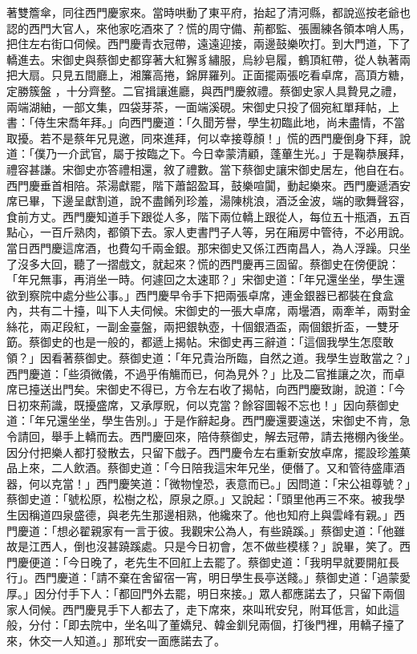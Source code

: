 著雙簷傘，同往西門慶家來。當時哄動了東平府，抬起了清河縣，都說巡按老爺也認的西門大官人，來他家吃酒來了？慌的周守備、荊都監、張團練各領本哨人馬，把住左右街口伺候。西門慶青衣冠帶，遠遠迎接，兩邊鼓樂吹打。到大門道，下了轎進去。宋御史與蔡御史都穿著大紅獬豸繡服，烏紗皂履，鶴頂紅帶，從人執著兩把大扇。只見五間廳上，湘簾高捲，錦屏羅列。正面擺兩張吃看卓席，高頂方糖，定勝簇盤 ，十分齊整。二官揖讓進廳，與西門慶敘禮。蔡御史家人具贄見之禮，兩端湖紬，一部文集，四袋芽茶，一面端溪硯。宋御史只投了個宛紅單拜帖，上書：「侍生宋喬年拜。」向西門慶道：「久聞芳譽，學生初臨此地，尚未盡情，不當取擾。若不是蔡年兄見邀，同來進拜，何以幸接尊顏！」慌的西門慶倒身下拜，說道：「僕乃一介武官，屬于按臨之下。今日幸蒙清顧，蓬蓽生光。」于是鞠恭展拜，禮容甚謙。宋御史亦答禮相還，敘了禮數。當下蔡御史讓宋御史居左，他自在右。西門慶垂首相陪。茶湯獻罷，階下蕭韶盈耳，鼓樂喧闐，動起樂來。西門慶遞酒安席已畢，下邊呈獻割道，說不盡餚列珍羞，湯陳桃浪，酒泛金波，端的歌舞聲容，食前方丈。西門慶知道手下跟從人多，階下兩位轎上跟從人，每位五十瓶酒，五百點心，一百斤熟肉，都領下去。家人吏書門子人等，另在廂房中管待，不必用說。當日西門慶這席酒，也費勾千兩金銀。那宋御史又係江西南昌人，為人浮躁。只坐了沒多大回，聽了一摺戲文，就起來？慌的西門慶再三固留。蔡御史在傍便說：「年兄無事，再消坐一時。何遽回之太速耶？」宋御史道：「年兄還坐坐，學生還欲到察院中處分些公事。」西門慶早令手下把兩張卓席，連金銀器已都裝在食盒內，共有二十擡，叫下人夫伺候。宋御史的一張大卓席，兩壜酒，兩牽羊，兩對金絲花，兩疋段紅，一副金臺盤，兩把銀執壺，十個銀酒盃，兩個銀折盃，一雙牙筯。蔡御史的也是一般的，都遞上揭帖。宋御史再三辭道：「這個我學生怎麼敢領？」因看著蔡御史。蔡御史道：「年兄貴治所臨，自然之道。我學生豈敢當之？」西門慶道：「些須微儀，不過乎侑觴而已，何為見外？」比及二官推讓之次，而卓席已擡送出門矣。宋御史不得已，方令左右收了揭帖，向西門慶致謝，說道：「今日初來荊識，既擾盛席，又承厚貺，何以克當？餘容圖報不忘也！」因向蔡御史道：「年兄還坐坐，學生告別。」于是作辭起身。西門慶還要遠送，宋御史不肯，急令請回，舉手上轎而去。西門慶回來，陪侍蔡御史，解去冠帶，請去捲棚內後坐。因分付把樂人都打發散去，只留下戲子。西門慶令左右重新安放卓席，擺設珍羞菓品上來，二人飲酒。蔡御史道：「今日陪我這宋年兄坐，便僭了。又和管待盛庫酒器，何以克當！」西門慶笑道：「微物惶恐，表意而已。」因問道：「宋公祖尊號？」蔡御史道：「號松原，松樹之松，原泉之原。」又說起：「頭里他再三不來。被我學生因稱道四泉盛德，與老先生那邊相熟，他纔來了。他也知府上與雲峰有親。」西門慶道：「想必翟親家有一言于彼。我觀宋公為人，有些蹺蹊。」蔡御史道：「他雖故是江西人，倒也沒甚蹺蹊處。只是今日初會，怎不做些模樣？」說畢，笑了。西門慶便道：「今日晚了，老先生不回舡上去罷了。蔡御史道：「我明早就要開舡長行」。西門慶道：「請不棄在舍留宿一宵，明日學生長亭送餞。」蔡御史道：「過蒙愛厚。」因分付手下人：「都回門外去罷，明日來接。」眾人都應諾去了，只留下兩個家人伺候。西門慶見手下人都去了，走下席來，來叫玳安兒，附耳低言，如此這般，分付：「即去院中，坐名叫了董嬌兒、韓金釧兒兩個，打後門裡，用轎子擡了來，休交一人知道。」那玳安一面應諾去了。

